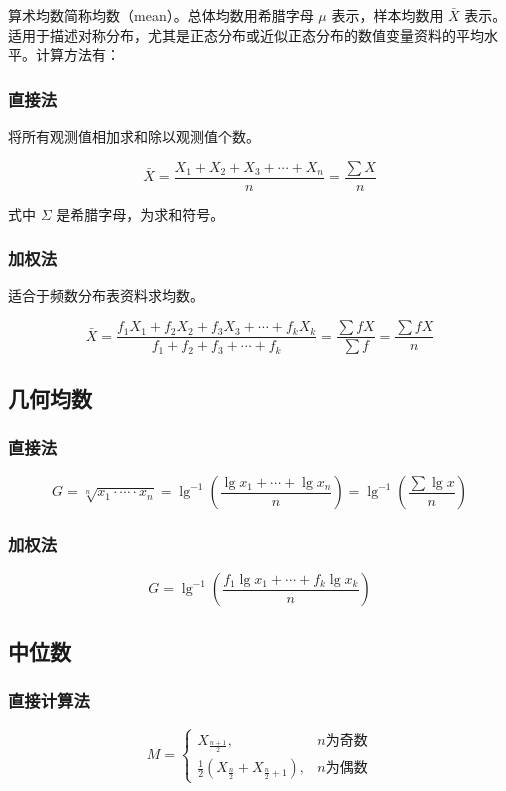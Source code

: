\documentclass[lang=cn,10pt]{elegantbook}
\begin{document}
算术均数简称均数（mean）。总体均数用希腊字母 $\mu$ 表示，样本均数用 $\bar{X}$ 表示。适用于描述对称分布，尤其是正态分布或近似正态分布的数值变量资料的平均水平。计算方法有：

\subsubsection{直接法}
将所有观测值相加求和除以观测值个数。

\begin{equation}
\bar{X}=\frac{X_1+X_2+X_3+\cdots+X_n}{n}=\frac{\sum X}{n}
\end{equation}

式中 $\Sigma$ 是希腊字母，为求和符号。
\subsubsection{加权法}
适合于频数分布表资料求均数。

\begin{equation}
\bar{X}=\frac{f_1X_1+f_2X_2+f_3X_3+\cdots+f_kX_k}{f_1+f_2+f_3+\cdots+f_k}=\frac{\sum fX}{\sum f}=\frac{\sum fX}{n}
\end{equation}
\subsection{几何均数}

\subsubsection{直接法}
\begin{equation}
G=\sqrt[n]{x_1\cdot\cdots\cdot x_n}=\lg^{-1}\left(\frac{\lg x_1+\cdots+\lg x_n}{n}\right)=\lg^{-1}\left(\frac{\sum \lg x}{n}\right)
\end{equation}

\subsubsection{加权法}
\begin{equation}
G=\lg^{-1}\left(\frac{f_1\lg x_1+\cdots+f_k\lg x_k}{n}\right)
\end{equation}

\subsection{中位数}
\subsubsection{直接计算法}
\begin{equation}
M=\left\{\begin{array}{ll}
X_{\frac{n+1}{2}}, & n\text{为奇数}\\[6pt]
\frac{1}{2}\left(X_{\frac{n}{2}}+X_{\frac{n}{2}+1}\right), & n\text{为偶数}
\end{array}\right.
\end{equation}
\end{document}

